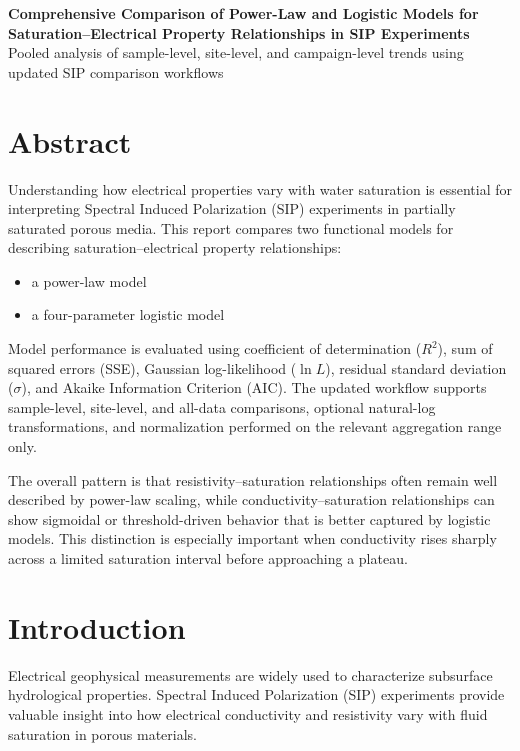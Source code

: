 \documentclass[11pt]{article}
\begin{document}
\begin{center}
{\LARGE\bfseries\color{accent} Comprehensive Comparison of Power-Law and Logistic Models for Saturation--Electrical Property Relationships in SIP Experiments}\\[0.4em]
{\large Pooled analysis of sample-level, site-level, and campaign-level trends using updated SIP comparison workflows}
\end{center}

\section{Abstract}

Understanding how electrical properties vary with water saturation is essential for interpreting Spectral Induced Polarization (SIP) experiments in partially saturated porous media. This report compares two functional models for describing saturation--electrical property relationships:

\begin{itemize}[leftmargin=1.5em]
\item a power-law model
\item a four-parameter logistic model
\end{itemize}

Model performance is evaluated using coefficient of determination ($R^2$), sum of squared errors (SSE), Gaussian log-likelihood ($\ln L$), residual standard deviation ($\sigma$), and Akaike Information Criterion (AIC). The updated workflow supports sample-level, site-level, and all-data comparisons, optional natural-log transformations, and normalization performed on the relevant aggregation range only.

The overall pattern is that resistivity--saturation relationships often remain well described by power-law scaling, while conductivity--saturation relationships can show sigmoidal or threshold-driven behavior that is better captured by logistic models. This distinction is especially important when conductivity rises sharply across a limited saturation interval before approaching a plateau.

\section{Introduction}

Electrical geophysical measurements are widely used to characterize subsurface hydrological properties. Spectral Induced Polarization (SIP) experiments provide valuable insight into how electrical conductivity and resistivity vary with fluid saturation in porous materials.
\end{document}
